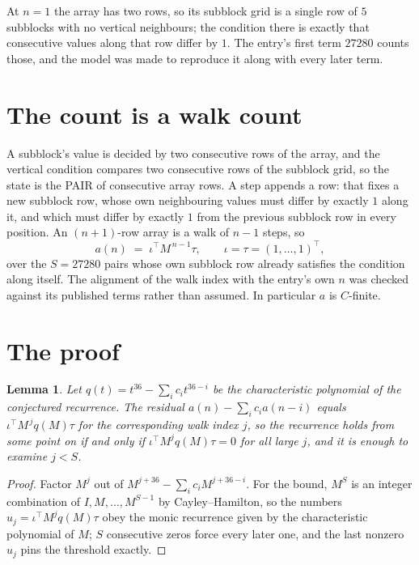 \documentclass[11pt,a4paper]{article}
\theoremstyle{plain}
\newtheorem{lemma}[theorem]{Lemma}
\theoremstyle{definition}
\begin{document}
At $n=1$ the array has two rows, so its subblock grid is a single row of $5$ subblocks with
no vertical neighbours; the condition there is exactly that consecutive values along that row
differ by $1$. The entry's first term $27280$ counts those, and the model was made to
reproduce it along with every later term.

\section{The count is a walk count}

A subblock's value is decided by two consecutive rows of the array, and the
vertical condition compares two consecutive rows of the subblock grid, so the state is the
PAIR of consecutive array rows. A step appends a row: that fixes a new subblock row, whose own
neighbouring values must differ by exactly $1$ along it, and which must differ by exactly
$1$ from the previous subblock row in every position. An $(n+1)$-row array is a walk of
$n-1$ steps, so
\[
a(n)\;=\;\iota^{\!\top}M^{\,n-1}\tau,\qquad\iota=\tau=(1,\dots,1)^{\!\top},
\]
over the $S=27280$ pairs whose own subblock row already satisfies the condition along itself.
The alignment of the walk index with the entry's own $n$ was checked against its published
terms rather than assumed. In particular $a$ is $C$-finite.

\section{The proof}

\begin{lemma}\label{lem:crit}
Let $q(t)=t^{36}-\sum_i c_it^{36-i}$ be the characteristic polynomial of the
conjectured recurrence. The residual $a(n)-\sum_ic_ia(n-i)$ equals
$\iota^{\!\top}M^{\,j}q(M)\tau$ for the corresponding walk index $j$, so the recurrence
holds from some point on if and only if $\iota^{\!\top}M^{j}q(M)\tau=0$ for all large $j$,
and it is enough to examine $j<S$.
\end{lemma}

\begin{proof}
Factor $M^{j}$ out of $M^{j+36}-\sum_ic_iM^{j+36-i}$. For the bound, $M^{S}$
is an integer combination of $I,M,\dots,M^{S-1}$ by Cayley--Hamilton, so the numbers
$u_j=\iota^{\!\top}M^{j}q(M)\tau$ obey the monic recurrence given by the characteristic
polynomial of $M$; $S$ consecutive zeros force every later one, and the last nonzero $u_j$
pins the threshold exactly.
\end{proof}
\end{document}
